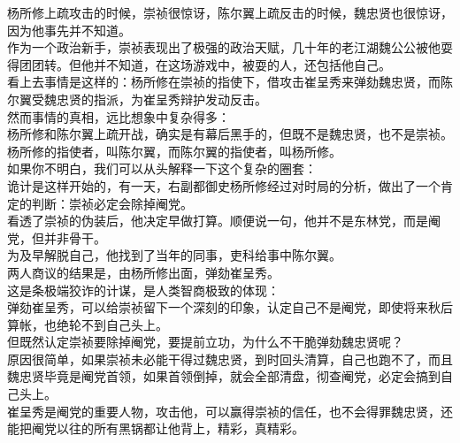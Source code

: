 \begin{multicols}{\theparacolNo}
杨所修上疏攻击的时候，崇祯很惊讶，陈尔翼上疏反击的时候，魏忠贤也很惊讶，因为他事先并不知道。\\

作为一个政治新手，崇祯表现出了极强的政治天赋，几十年的老江湖魏公公被他耍得团团转。但他并不知道，在这场游戏中，被耍的人，还包括他自己。\\

看上去事情是这样的：杨所修在崇祯的指使下，借攻击崔呈秀来弹劾魏忠贤，而陈尔翼受魏忠贤的指派，为崔呈秀辩护发动反击。\\

然而事情的真相，远比想象中复杂得多：\\

杨所修和陈尔翼上疏开战，确实是有幕后黑手的，但既不是魏忠贤，也不是崇祯。\\

杨所修的指使者，叫陈尔翼，而陈尔翼的指使者，叫杨所修。\\

如果你不明白，我们可以从头解释一下这个复杂的圈套：\\

诡计是这样开始的，有一天，右副都御史杨所修经过对时局的分析，做出了一个肯定的判断：崇祯必定会除掉阉党。\\

看透了崇祯的伪装后，他决定早做打算。顺便说一句，他并不是东林党，而是阉党，但并非骨干。\\

为及早解脱自己，他找到了当年的同事，吏科给事中陈尔翼。\\

两人商议的结果是，由杨所修出面，弹劾崔呈秀。\\

这是条极端狡诈的计谋，是人类智商极致的体现：\\

弹劾崔呈秀，可以给崇祯留下一个深刻的印象，认定自己不是阉党，即使将来秋后算帐，也绝轮不到自己头上。\\

但既然认定崇祯要除掉阉党，要提前立功，为什么不干脆弹劾魏忠贤呢？\\

原因很简单，如果崇祯未必能干得过魏忠贤，到时回头清算，自己也跑不了，而且魏忠贤毕竟是阉党首领，如果首领倒掉，就会全部清盘，彻查阉党，必定会搞到自己头上。\\

崔呈秀是阉党的重要人物，攻击他，可以赢得崇祯的信任，也不会得罪魏忠贤，还能把阉党以往的所有黑锅都让他背上，精彩，真精彩。\\


\end{multicols}

